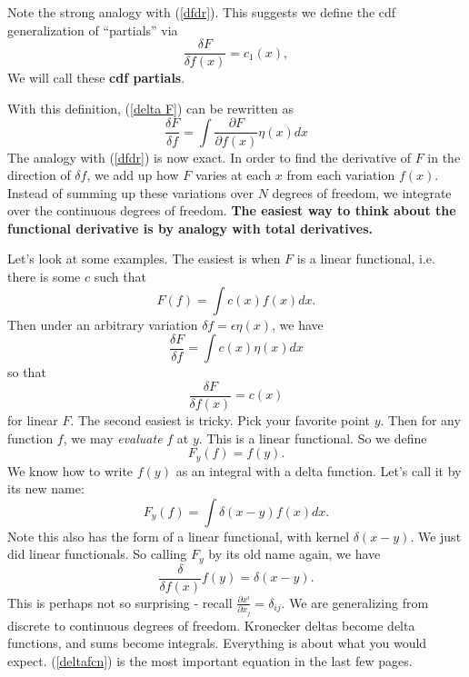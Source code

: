 \documentclass{book}
\begin{document}
Note the strong analogy with (\ref{dfdr}). This suggests we define the cdf generalization of ``partials'' via
\begin{equation}
\frac{\delta F}{\delta f(x)} = c_1 (x),
\end{equation}
We will call these \textbf{cdf partials}.

With this definition, (\ref{delta F}) can be rewritten as 
\begin{equation} \label{dFdf}
\boxed{\frac{\delta F}{\delta f} = \int \frac{\partial F}{\partial f(x)} \eta (x) dx}
\end{equation}
The analogy with (\ref{dfdr}) is now exact. In order to find the derivative of $F$ in the direction of $\delta{f}$, we add up how $F$ varies at each $x$ from each variation $f(x)$. Instead of summing up these variations over $N$ degrees of freedom, we integrate over the continuous degrees of freedom. \textbf{The easiest way to think about the functional derivative is by analogy with total derivatives.}

Let's look at some examples. The easiest is when $F$ is a linear functional, i.e. there is some $c$ such that
\[
F(f) = \int c(x) f(x) dx.
\]
Then under an arbitrary variation $\delta f = \epsilon \eta(x)$, we have
\[
\frac{\delta F}{\delta f} = \int c(x) \eta (x) dx
\]
so that
\begin{equation} \label{linearF}
\boxed{\frac{\delta F}{\delta f(x)} = c(x)}
\end{equation}
for linear $F$. The second easiest is tricky. Pick your favorite point $y$. Then for any function $f$, we may \textit{evaluate} $f$ at $y$. This is a linear functional. So we define
\[
F_y (f) = f(y).
\]
We know how to write $f(y)$ as an integral with a delta function. Let's call it by its new name:
\[
F_y (f) = \int \delta(x-y) f(x) dx.
\]
Note this also has the form of a linear functional, with kernel $\delta (x-y)$. We just did linear functionals. So calling $F_y$ by its old name again, we have
\begin{equation} \label{deltafcn}
\boxed{\frac{\delta}{\delta f(x)} f(y) = \delta (x -y)}.
\end{equation}
This is perhaps not so surprising - recall $\frac{\partial x^i}{\partial x_j} = \delta_{ij}$. We are generalizing from discrete to continuous degrees of freedom. Kronecker deltas become delta functions, and sums become integrals. Everything is about what you would expect. (\ref{deltafcn}) is the most important equation in the last few pages. 
\end{document}
